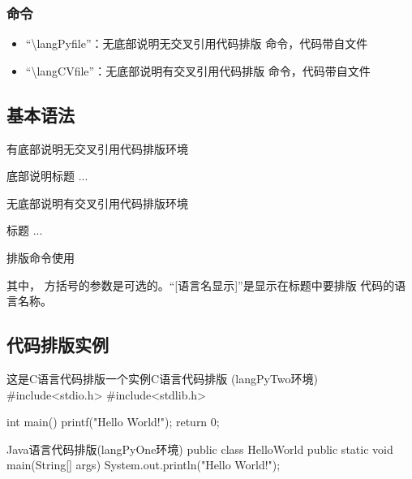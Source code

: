 \documentclass{ctexart}
\newcommand{\qtmark}[1]{``#1''}
\begin{document}
\subsubsection{命令}
\begin{itemize}
\item \qtmark{\textbackslash langPyfile}：无底部说明无交叉引用代码排版
  命令，代码带自文件
\item \qtmark{\textbackslash langCVfile}：无底部说明有交叉引用代码排版
  命令，代码带自文件
\end{itemize}

\subsection{基本语法}
\begin{langPyOne}[tex]{有底部说明无交叉引用代码排版环境}
  \begin{langPyTwo}[语言]{底部说明}{标题}
     ...
   \end{langPyTwo} 
\end{langPyOne}


\begin{langPyOne}[tex]{无底部说明有交叉引用代码排版环境}
  \begin{langCVOne}[语言][交叉引用标签][显示语言名]{标题}
     ...
   \end{langCVOne} 
\end{langPyOne}

\begin{langPyOne}[tex]{排版命令使用}
\end{langPyOne}
其中， 方括号的参数是可选的。\qtmark{[语言名显示]}是显示在标题中要排版
代码的语言名称。

\subsection{代码排版实例}
\begin{langPyTwo}[c]{这是C语言代码排版一个实例}{C语言代码排版
    (langPyTwo环境)}
  #include<stdio.h>
  #include<stdlib.h>

  int main()
  {
    printf("Hello World!\n");
    return 0;
  }
\end{langPyTwo}

\begin{langPyOne}[java]{Java语言代码排版(langPyOne环境)}
  public class HelloWorld {
    public static void main(String[] args){
      System.out.println("Hello World!");
    }
  }
\end{langPyOne}
\end{document}
